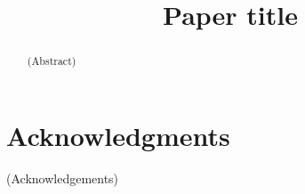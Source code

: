 \documentclass[sigconf,review, anonymous]{acmart}
\begin{document}
\title{Paper title}






\keywords{}
 

\begin{abstract}
(Abstract)
\end{abstract}



\maketitle












\section{Acknowledgments}
(Acknowledgements)


\balance


\end{document}
